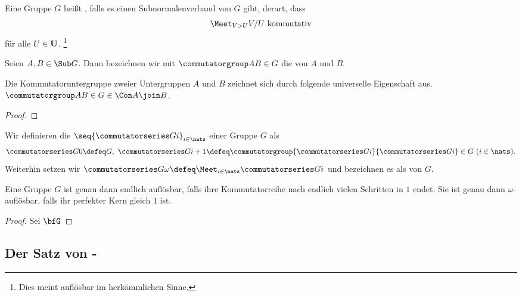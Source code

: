 \begin{definition}
    Eine Gruppe $G$ heißt , falls es einen Subnormalenverband von $G$ gibt, derart, dass
    $$
    \Meet_{V>U} V / U\ \textrm{kommutativ}
    $$
    für alle $U\in\bf U$. \footnote{Dies meint auflösbar im herkömmlichen Sinne.}
\end{definition}

\begin{definition}[Kommutatoruntergruppe]
    Seien $A,B\in\Sub G$. Dann bezeichnen wir mit $\commutatorgroup A B\in G$ die  von $A$ und $B$.
\end{definition}

\begin{lemma}
    Die Kommutatoruntergruppe zweier Untergruppen $A$ und $B$ zeichnet sich durch folgende universelle Eigenschaft aus.
    $\commutatorgroup A B \in G\in\Con A\join B$.
\end{lemma}

\begin{proof}
    
\end{proof}

\begin{definition}[Kommutatorreihe]
    Wir definieren die  $\seq{\commutatorseries G i}_{i\in \nats}$ einer Gruppe $G$ als
    $$\commutatorseries G 0 \defeq G,\ \commutatorseries G {i+1} \defeq \commutatorgroup {\commutatorseries G i}
    {\commutatorseries G i} \in G\ (i\in\nats).$$
    Weiterhin setzen wir $\commutatorseries G \omega \defeq \Meet_{i\in\nats} \commutatorseries G i$ und bezeichnen es als
     von $G$.
\end{definition}

\begin{lemma}
    Eine Gruppe $G$ ist genau dann endlich auflösbar, falls ihre Kommutatorreihe nach endlich vielen Schritten in $1$ endet.
    Sie ist genau dann $\omega$-auflösbar, falls ihr perfekter Kern gleich $1$ ist.
\end{lemma}

\begin{proof}
    Sei $\bfG$
\end{proof}

\subsection{Der Satz von -}

